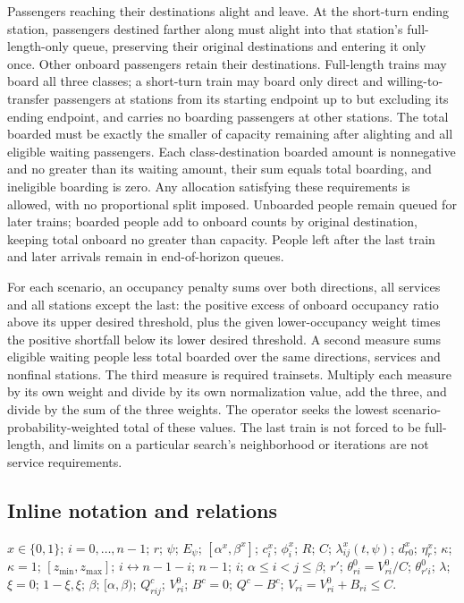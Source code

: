 \documentclass[10pt]{article}
\begin{document}
Passengers reaching their destinations alight and leave. At the short-turn ending station, passengers destined farther along must alight into that station's full-length-only queue, preserving their original destinations and entering it only once. Other onboard passengers retain their destinations. Full-length trains may board all three classes; a short-turn train may board only direct and willing-to-transfer passengers at stations from its starting endpoint up to but excluding its ending endpoint, and carries no boarding passengers at other stations. The total boarded must be exactly the smaller of capacity remaining after alighting and all eligible waiting passengers. Each class-destination boarded amount is nonnegative and no greater than its waiting amount, their sum equals total boarding, and ineligible boarding is zero. Any allocation satisfying these requirements is allowed, with no proportional split imposed. Unboarded people remain queued for later trains; boarded people add to onboard counts by original destination, keeping total onboard no greater than capacity. People left after the last train and later arrivals remain in end-of-horizon queues.

For each scenario, an occupancy penalty sums over both directions, all services and all stations except the last: the positive excess of onboard occupancy ratio above its upper desired threshold, plus the given lower-occupancy weight times the positive shortfall below its lower desired threshold. A second measure sums eligible waiting people less total boarded over the same directions, services and nonfinal stations. The third measure is required trainsets. Multiply each measure by its own weight and divide by its own normalization value, add the three, and divide by the sum of the three weights. The operator seeks the lowest scenario-probability-weighted total of these values. The last train is not forced to be full-length, and limits on a particular search's neighborhood or iterations are not service requirements.

\subsection*{Inline notation and relations}
$x\in\{0,1\}$; $i=0,\ldots,n-1$; $r$; $\psi$; $E_\psi$; $[\alpha^x,\beta^x]$; $c_i^x$; $\phi_i^x$; $R$; $C$; $\lambda_{ij}^x(t,\psi)$; $d^x_{r0}$; $\eta^x_r$; $\kappa$; $\kappa=1$; $[z_{\min},z_{\max}]$; $i\leftrightarrow n-1-i$; $n-1$; $i$; $\alpha\le i<j\le\beta$; $r'$; $\theta^0_{ri}=V^0_{ri}/C$; $\theta^0_{r'i}$; $\lambda$; $\xi=0$; $1-\xi,\xi$; $\beta$; $[\alpha,\beta)$; $Q^c_{rij}$; $V^0_{ri}$; $B^c=0$; $Q^c-B^c$; $V_{ri}=V^0_{ri}+B_{ri}\le C$.
\end{document}
